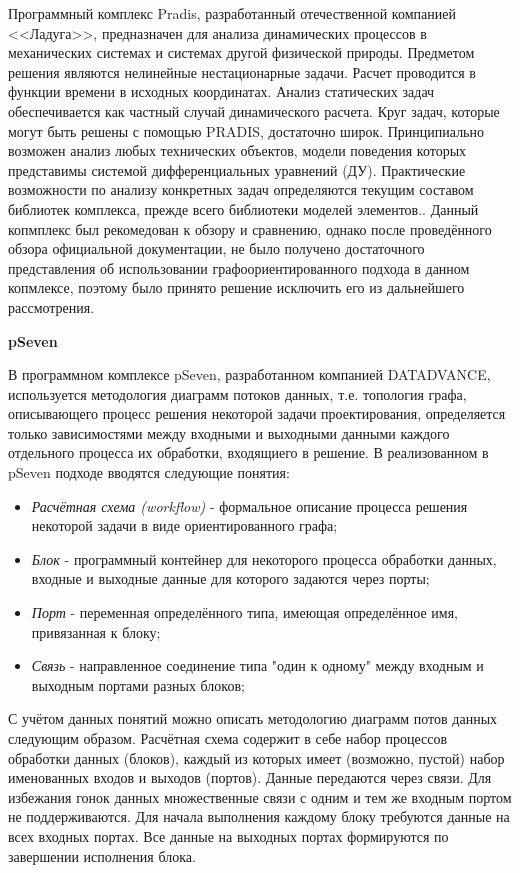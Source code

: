 Программный комплекс Pradis, разработанный отечественной компанией <<Ладуга>>, предназначен для анализа динамических процессов в механических системах и системах другой физической природы. Предметом решения являются  нелинейные нестационарные задачи. Расчет проводится в функции времени в исходных координатах. Анализ статических задач обеспечивается как частный случай динамического расчета. Круг задач, которые могут быть решены с помощью PRADIS, достаточно широк. Принципиально возможен анализ любых технических объектов, модели поведения которых представимы системой дифференциальных уравнений (ДУ). Практические возможности по анализу конкретных задач определяются текущим составом библиотек комплекса, прежде всего библиотеки моделей элементов.\cite{PradisGeneral2007}. Данный копмплекс был рекомедован к обзору и сравнению, однако после проведённого обзора официальной документации\cite{PradisMethods2007}, не было получено достаточного представления об использовании графоориентированного подхода в данном копмлексе, поэтому было принято решение исключить его из дальнейшего рассмотрения.

\textbf{pSeven}

В программном комплексе pSeven, разработанном компанией DATADVANCE, используется методология диаграмм потоков данных, т.е. топология графа, описывающего процесс решения некоторой задачи проектирования, определяется только зависимостями между входными и выходными данными каждого отдельного процесса их обработки, входящиего в решение. \cite{Nazarenko2015} В реализованном в pSeven подходе вводятся следующие понятия:
\begin{itemize}
    \item \emph{Расчётная схема (workflow)} - формальное описание процесса решения некоторой задачи в виде ориентированного графа;
    \item \emph{Блок} - программный контейнер для некоторого процесса обработки данных, входные и выходные данные для которого задаются через порты;
    \item \emph{Порт} - переменная определённого типа, имеющая определённое имя, привязанная к блоку;
    \item \emph{Связь} - направленное соединение типа "один к одному" между входным и выходным портами разных блоков;
\end{itemize}

С учётом данных понятий можно описать методологию диаграмм потов данных следующим образом. Расчётная схема содержит в себе набор процессов обработки данных (блоков), каждый из которых имеет (возможно, пустой) набор именованных входов и выходов (портов). Данные передаются через связи. Для избежания гонок данных множественные связи с одним и тем же входным портом не поддерживаются. Для начала выполнения каждому блоку требуются данные на всех входных портах. Все данные на выходных портах формируются по завершении исполнения блока.\cite{Nazarenko2015}

